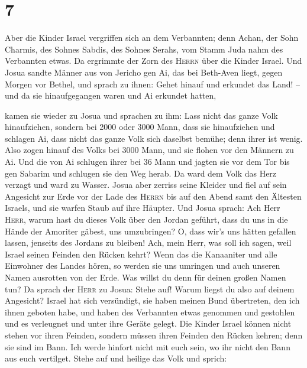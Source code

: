 \hypertarget{section-6}{%
\section{7}\label{section-6}}

 Aber die Kinder Israel vergriffen sich an dem Verbannten;
denn Achan, der Sohn Charmis, des Sohnes Sabdis, des Sohnes Serahs, vom
Stamm Juda nahm des Verbannten etwas. Da ergrimmte der Zorn des
\textsc{Herrn} über die Kinder Israel.  Und Josua sandte
Männer aus von Jericho gen Ai, das bei Beth-Aven liegt, gegen Morgen vor
Bethel, und sprach zu ihnen: Gehet hinauf und erkundet das Land! -- und
da sie hinaufgegangen waren und Ai erkundet hatten,

 kamen sie wieder zu Josua und sprachen zu ihm: Lass nicht
das ganze Volk hinaufziehen, sondern bei 2000 oder 3000 Mann, dass sie
hinaufziehen und schlagen Ai, dass nicht das ganze Volk sich daselbst
bemühe; denn ihrer ist wenig.  Also zogen hinauf des Volks
bei 3000 Mann, und sie flohen vor den Männern zu Ai.  Und
die von Ai schlugen ihrer bei 36 Mann und jagten sie vor dem Tor bis gen
Sabarim und schlugen sie den Weg herab. Da ward dem Volk das Herz
verzagt und ward zu Wasser.  Josua aber zerriss seine
Kleider und fiel auf sein Angesicht zur Erde vor der Lade des
\textsc{Herrn} bis auf den Abend samt den Ältesten Israels, und sie
warfen Staub auf ihre Häupter.  Und Josua sprach: Ach Herr
\textsc{Herr}, warum hast du dieses Volk über den Jordan geführt, dass
du uns in die Hände der Amoriter gäbest, uns umzubringen? O, dass wir's
uns hätten gefallen lassen, jenseits des Jordans zu bleiben!
 Ach, mein Herr, was soll ich sagen, weil Israel seinen
Feinden den Rücken kehrt?  Wenn das die Kanaaniter und
alle Einwohner des Landes hören, so werden sie uns umringen und auch
unseren Namen ausrotten von der Erde. Was willst du denn für deinen
großen Namen tun?  Da sprach der \textsc{Herr} zu Josua:
Stehe auf! Warum liegst du also auf deinem Angesicht? 
Israel hat sich versündigt, sie haben meinen Bund übertreten, den ich
ihnen geboten habe, und haben des Verbannten etwas genommen und
gestohlen und es verleugnet und unter ihre Geräte gelegt.
 Die Kinder Israel können nicht stehen vor ihren Feinden,
sondern müssen ihren Feinden den Rücken kehren; denn sie sind im Bann.
Ich werde hinfort nicht mit euch sein, wo ihr nicht den Bann aus euch
vertilget.  Stehe auf und heilige das Volk und sprich:
